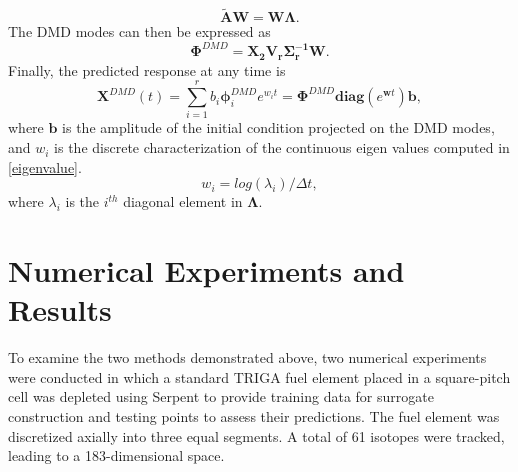 \documentclass{anstrans}
\begin{document}
 \begin{equation}\label{eigenvalue}
 \mathbf{\tilde{A} W}=\mathbf{W \Lambda}.
 \end{equation}
The DMD modes can then be expressed as
\begin {equation}
{\mathbf{\Phi}}^{DMD}={\mathbf{X_2V_r\Sigma_r^{-1}W}}.
\end{equation}
Finally, the predicted response at any time is
\begin{equation}
\mathbf{X}^{DMD}(t)=\sum_{i=1}^{r} b_i \mathbf{\phi}_i^{DMD} e^{w_it}={\mathbf{\Phi}}^{DMD}{\mathbf{diag}}(e^{\mathbf{w}t})\mathbf{b},
\end{equation}
where $\textbf{b}$ is the amplitude of the initial condition projected on the DMD modes, and $w_i$ is the discrete characterization of the continuous eigen values computed in \eqref{eigenvalue}.
\begin{equation}
w_i=log(\lambda_i)/\Delta t,
\end{equation}
where $\lambda_i$ is the $i^{th}$ diagonal element in $\boldsymbol{\Lambda}$.



\section{Numerical Experiments and Results}
To examine the two methods demonstrated above, two numerical experiments were conducted in which a standard TRIGA fuel element placed in a square-pitch cell was depleted using Serpent to provide training data for  surrogate construction and  testing points to assess their predictions. The fuel element was discretized axially into three equal segments. A total of 61 isotopes were tracked, leading to a 183-dimensional space.
\end{document}
